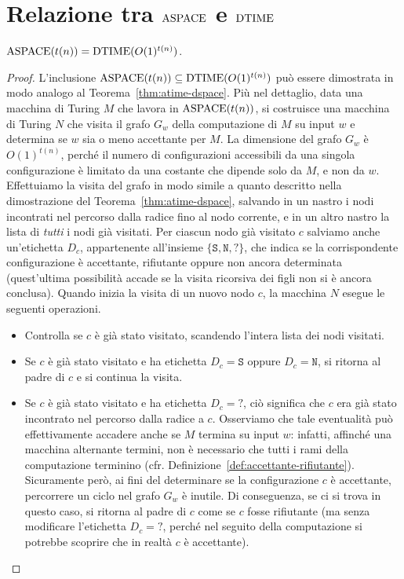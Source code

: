 \section{Relazione tra \texorpdfstring{$\operatorname{ASPACE}$}{ASPACE} e \texorpdfstring{$\operatorname{DTIME}$}{DTIME}}

\begin{teorema}
  \label{thm:aspace-dtime}
  $\operatorname{ASPACE}(t(n)) = \operatorname{DTIME}(O(1)^{t(n)})$.
\end{teorema}

\begin{proof}
  L'inclusione $\operatorname{ASPACE}(t(n)) \subseteq \operatorname{DTIME}(O(1)^{t(n)})$ può essere dimostrata in modo analogo al
  Teorema~\ref{thm:atime-dspace}. Più nel dettaglio, data una macchina di Turing $M$ che lavora in $\operatorname{ASPACE}(t(n))$,
  si costruisce una macchina di Turing $N$ che visita il grafo $G_w$ della computazione di $M$ su input $w$
  e determina se $w$ sia o meno accettante per $M$. La dimensione del grafo $G_w$ è $O(1)^{t(n)}$,
  perché il numero di configurazioni accessibili da una singola configurazione è limitato da una costante che dipende
  solo da $M$, e non da $w$.
  Effettuiamo la visita del grafo in modo simile a quanto descritto nella dimostrazione del Teorema~\ref{thm:atime-dspace}, salvando in un nastro i nodi incontrati nel percorso dalla radice fino al nodo corrente, e in un altro nastro la lista di \emph{tutti} i nodi già visitati.
  Per ciascun nodo già visitato $c$ salviamo anche un'etichetta $D_c$, appartenente all'insieme $\{\texttt{S}, \texttt{N}, \texttt{?}\}$, che indica se la corrispondente configurazione è accettante, rifiutante oppure non ancora determinata (quest'ultima possibilità accade se la visita ricorsiva dei figli non si è ancora conclusa).
  Quando inizia la visita di un nuovo nodo $c$, la macchina $N$ esegue le seguenti operazioni.
  \begin{itemize}
    \item Controlla se $c$ è già stato visitato, scandendo l'intera lista dei nodi visitati.
    
    \item Se $c$ è già stato visitato e ha etichetta $D_c=\texttt{S}$ oppure $D_c=\texttt{N}$, si ritorna al padre di $c$ e si continua la visita.
    
    \item Se $c$ è già stato visitato e ha etichetta $D_c=\texttt{?}$, ciò significa che $c$ era già stato incontrato nel percorso dalla radice a $c$. Osserviamo che tale eventualità può effettivamente accadere anche se $M$ termina su input $w$: infatti, affinché una macchina alternante termini, non è necessario che tutti i rami della computazione terminino (cfr. Definizione~\ref{def:accettante-rifiutante}).
    Sicuramente però, ai fini del determinare se la configurazione $c$ è accettante, percorrere un ciclo nel grafo $G_w$ è inutile.
    Di conseguenza, se ci si trova in questo caso, si ritorna al padre di $c$ come se $c$ fosse rifiutante (ma senza modificare l'etichetta $D_c=\texttt{?}$, perché nel seguito della computazione si potrebbe scoprire che in realtà $c$ è accettante).
    

\end{itemize}
\end{proof}
